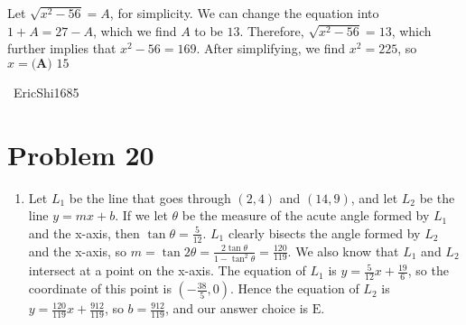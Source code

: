 \documentclass{article}%
\begin{document}
\begin{enumerate}
Let $\sqrt{x^2 - 56} = A$, for simplicity. We can change the equation into $1 + A = 27 - A$, which we find $A$ to be $13$. Therefore, $\sqrt{x^2 - 56} = 13$, which further implies that $x^2 - 56 = 169$. After simplifying, we find $x^2 = 225$, so $x = \boxed{\textbf{(A) } 15}$

~EricShi1685

%
\end{enumerate}

%
\section*{Problem 20}%
\label{sec:Problem20}%
\begin{enumerate}%
\item%
Let $L_1$ be the line that goes through $(2,4)$ and $(14,9)$, and let $L_2$ be the line $y=mx+b$. If we let $\theta$ be the measure of the acute angle formed by $L_1$ and the x-axis, then $\tan\theta=\frac{5}{12}$. $L_1$ clearly bisects the angle formed by $L_2$ and the x-axis, so $m=\tan{2\theta}=\frac{2\tan\theta}{1-\tan^2{\theta}}=\frac{120}{119}$. We also know that $L_1$ and $L_2$ intersect at a point on the x-axis. The equation of $L_1$ is $y=\frac{5}{12}x+\frac{19}{6}$, so the coordinate of this point is $\left(-\frac{38}{5},0\right)$. Hence the equation of $L_2$ is $y=\frac{120}{119}x+\frac{912}{119}$, so $b=\frac{912}{119}$, and our answer choice is $\boxed{\mathrm{E}}$.

%
\end{enumerate}

%
\end{document}

